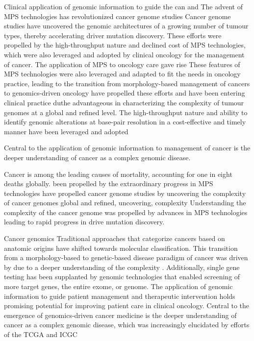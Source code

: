 Clinical application of genomic information to guide the can and The advent of MPS technologies has revolutionized cancer genome studies
Cancer genome studies have uncovered the genomic architectures of a growing number of tumour types, thereby accelerating driver mutation discovery. These efforts were propelled by the high-throughput nature and declined cost of MPS technologies, which were also leveraged and adopted by clinical oncology for the management of cancer. The application of MPS to oncology care gave rise   These features of MPS technologies were also leveraged and adapted to fit the needs in oncology practice, leading to the transition from morphology-based management of cancers to genomics-driven oncology  have propelled these efforts and have been entering clinical practice duthe advantageous in characterizing the complexity of tumour genomes at a global and refined level. The high-throughput nature and ability to identify genomic alterations at base-pair resolution in a cost-effective and timely manner have been leveraged and adopted

Central to the application of genomic information to management of cancer is the deeper understanding of cancer as a complex genomic disease.

Cancer is among the leading causes of mortality, accounting for one in eight deaths globally.
been propelled by the extraordinary progress in MPS technologies have propelled cancer genome studies by uncovering the complexity of cancer genomes
global and refined, uncovering, complexity
Understanding the complexity of the cancer genome was propelled by advances in MPS technologies leading to rapid progress in drive mutation discovery.

Cancer genomics Traditional approaches that categorize cancers based on anatomic origins have shifted towards molecular classification. This transition from a morphology-based to genetic-based disease paradigm of cancer was driven by due to a deeper understanding of the complexity . Additionally, single gene testing has been supplanted by genomic technologies that enabled screening of more target genes, the entire exome, or genome. The application of genomic information to guide patient management and therapeutic intervention holds promising potential for improving patient care in clinical oncology. Central to the emergence of genomics-driven cancer medicine is the deeper understanding of cancer as a complex genomic disease, which was increasingly elucidated by efforts of the TCGA and ICGC

